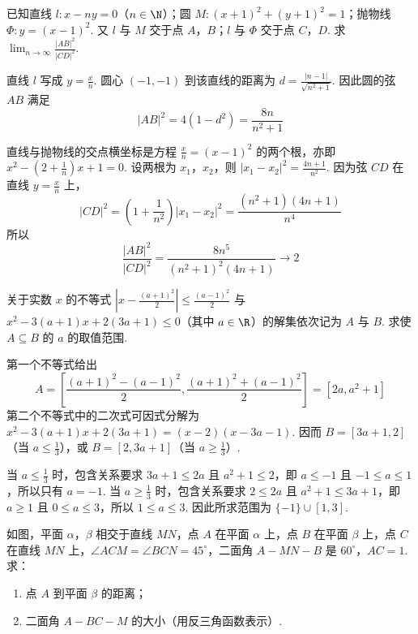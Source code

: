 \documentclass[UTF8,a4paper,oneside,11pt]{ctexbook}
\begin{document}
\begin{problem}
已知直线 \(l:x-ny=0\)（\(n\in\N\)）；圆 \(M:(x+1)^2+(y+1)^2=1\)；抛物线 \(\Phi:y=(x-1)^2\). 又 \(l\) 与 \(M\) 交于点 \(A\)，\(B\)；\(l\) 与 \(\Phi\) 交于点 \(C\)，\(D\). 求 \(\displaystyle\lim_{n\to\infty}\frac{\left|AB\right|^2}{\left|CD\right|^2}\).
\end{problem}

\begin{solution}
直线 \(l\) 写成 \(y=\frac{x}{n}\). 圆心 \((-1,-1)\) 到该直线的距离为
\(d=\frac{|n-1|}{\sqrt{n^2+1}}\). 因此圆的弦 \(AB\) 满足
\[
\left|AB\right|^2=4(1-d^2)=\frac{8n}{n^2+1}
\]

直线与抛物线的交点横坐标是方程 \(\frac{x}{n}=(x-1)^2\) 的两个根，亦即
\(x^2-\left(2+\frac1n\right)x+1=0\). 设两根为 \(x_1\)，\(x_2\)，则
\(\left|x_1-x_2\right|^2=\frac{4n+1}{n^2}\). 因为弦 \(CD\) 在直线 \(y=\frac{x}{n}\) 上，
\[
\left|CD\right|^2=\left(1+\frac1{n^2}\right)\left|x_1-x_2\right|^2=\frac{(n^2+1)(4n+1)}{n^4}
\]
所以
\[
\frac{\left|AB\right|^2}{\left|CD\right|^2}=\frac{8n^5}{(n^2+1)^2(4n+1)}\longrightarrow2
\]
\end{solution}

\begin{problem}
关于实数 \(x\) 的不等式 \(\left|x-\frac{(a+1)^2}{2}\right|\le\frac{(a-1)^2}{2}\) 与 \(x^2-3(a+1)x+2(3a+1)\le0\)（其中 \(a\in\R\)）的解集依次记为 \(A\) 与 \(B\). 求使 \(A\subseteq B\) 的 \(a\) 的取值范围.
\end{problem}

\begin{solution}
第一个不等式给出
\[
A=\left[\frac{(a+1)^2-(a-1)^2}{2},\frac{(a+1)^2+(a-1)^2}{2}\right]=[2a,a^2+1]
\]
第二个不等式中的二次式可因式分解为
\(x^2-3(a+1)x+2(3a+1)=(x-2)(x-3a-1)\). 因而
\(B=[3a+1,2]\)（当 \(a\le\frac13\)），或 \(B=[2,3a+1]\)（当 \(a\ge\frac13\)）.

当 \(a\le\frac13\) 时，包含关系要求 \(3a+1\le2a\) 且 \(a^2+1\le2\)，即 \(a\le-1\) 且 \(-1\le a\le1\)，所以只有 \(a=-1\). 当 \(a\ge\frac13\) 时，包含关系要求 \(2\le2a\) 且 \(a^2+1\le3a+1\)，即 \(a\ge1\) 且 \(0\le a\le3\)，所以 \(1\le a\le3\). 因此所求范围为 \(\{-1\}\cup[1,3]\).
\end{solution}

\begin{problem}
如图，平面 \(\alpha\)，\(\beta\) 相交于直线 \(MN\)，点 \(A\) 在平面 \(\alpha\) 上，点 \(B\) 在平面 \(\beta\) 上，点 \(C\) 在直线 \(MN\) 上，\(\angle ACM=\angle BCN=45^\circ\)，二面角 \(A-MN-B\) 是 \(60^\circ\)，\(AC=1\). 求：

\begin{enumerate}
\item 点 \(A\) 到平面 \(\beta\) 的距离；
\item 二面角 \(A-BC-M\) 的大小（用反三角函数表示）.
\end{enumerate}

\FloatBarrier
\end{problem}
\end{document}
